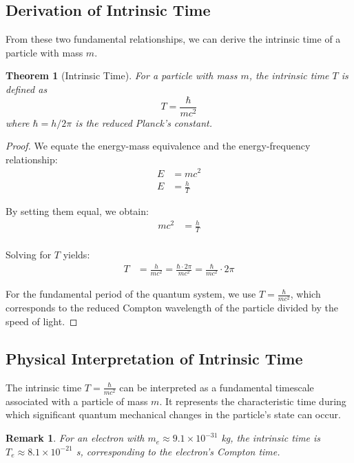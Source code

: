 \documentclass[a4paper,12pt]{article}
\newtheorem{theorem}{Theorem}[section]
\newtheorem{remark}{Remark}[section]
\begin{document}
	\subsection{Derivation of Intrinsic Time}
	
	From these two fundamental relationships, we can derive the intrinsic time of a particle with mass \( m \).
	
	\begin{theorem}[Intrinsic Time]
		For a particle with mass \( m \), the intrinsic time \( T \) is defined as
		\begin{equation}
			T = \frac{\hbar}{mc^2}
		\end{equation}
		where \( \hbar = h/2\pi \) is the reduced Planck’s constant.
	\end{theorem}
	
	\begin{proof}
		We equate the energy-mass equivalence and the energy-frequency relationship:
		\begin{align}
			E &= mc^2 \\
			E &= \frac{h}{T}
		\end{align}
		
		By setting them equal, we obtain:
		\begin{align}
			mc^2 &= \frac{h}{T} \\
		\end{align}
		
		Solving for \( T \) yields:
		\begin{align}
			T &= \frac{h}{mc^2} = \frac{\hbar \cdot 2\pi}{mc^2} = \frac{\hbar}{mc^2} \cdot 2\pi
		\end{align}
		
		For the fundamental period of the quantum system, we use \( T = \frac{\hbar}{mc^2} \), which corresponds to the reduced Compton wavelength of the particle divided by the speed of light.
	\end{proof}
	
	\subsection{Physical Interpretation of Intrinsic Time}
	
	The intrinsic time \( T = \frac{\hbar}{mc^2} \) can be interpreted as a fundamental timescale associated with a particle of mass \( m \). It represents the characteristic time during which significant quantum mechanical changes in the particle’s state can occur.
	
	\begin{remark}
		For an electron with \( m_e \approx 9.1 \times 10^{-31} \) kg, the intrinsic time is \( T_e \approx 8.1 \times 10^{-21} \) s, corresponding to the electron’s Compton time.
	\end{remark}
	
\end{document}
